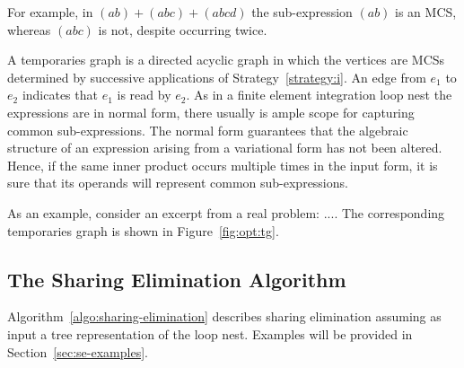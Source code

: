 For example, in $(a b) + (a b c) + (a b c d)$ the sub-expression $(a b)$ is an MCS, whereas $(a b c)$ is not, despite occurring twice. 

A temporaries graph is a directed acyclic graph in which the vertices are MCSs determined by successive applications of Strategy~\ref{strategy:i}. An edge from $e_1$ to $e_2$ indicates that $e_1$ is read by $e_2$. As in a finite element integration loop nest the expressions are in normal form, there usually is ample scope for capturing common sub-expressions. The normal form guarantees that the algebraic structure of an expression arising from a variational form has not been altered. Hence, if the same inner product occurs multiple times in the input form, it is sure that its operands will represent common sub-expressions. 

As an example, consider an excerpt from a real problem: $...$. The corresponding temporaries graph is shown in Figure~\ref{fig:opt:tg}. 






\subsection{The Sharing Elimination Algorithm}
\label{sec:se-algo}
Algorithm~\ref{algo:sharing-elimination} describes sharing elimination assuming as input a tree representation of the loop nest. Examples will be provided in Section~\ref{sec:se-examples}.

